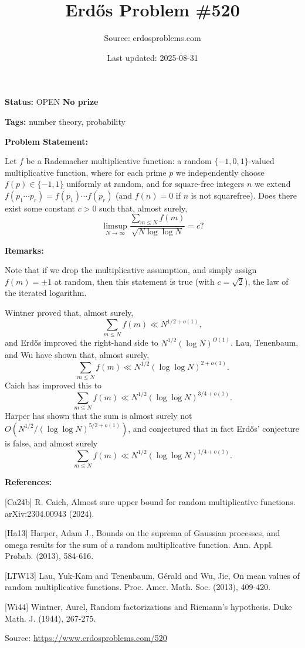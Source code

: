 \documentclass{article}
\title{Erd\H{o}s Problem \#520}
\date{Last updated: 2025-08-31}
\author{Source: erdosproblems.com}
\begin{document}
\maketitle

\noindent\textbf{Status:} OPEN \quad \textbf{No prize}

\noindent\textbf{Tags:} number theory, probability

\medskip
\noindent\textbf{Problem Statement:}

Let $f$ be a Rademacher multiplicative function: a random $\{-1,0,1\}$-valued multiplicative function, where for each prime $p$ we independently choose $f(p)\in \{-1,1\}$ uniformly at random, and for square-free integers $n$ we extend $f(p_1\cdots p_r)=f(p_1)\cdots f(p_r)$ (and $f(n)=0$ if $n$ is not squarefree). Does there exist some constant $c>0$ such that, almost surely,\[\limsup_{N\to \infty}\frac{\sum_{m\leq N}f(m)}{\sqrt{N\log\log N}}=c?\]

\bigskip
\noindent\textbf{Remarks:}

Note that if we drop the multiplicative assumption, and simply assign $f(m)=\pm 1$ at random, then this statement is true (with $c=\sqrt{2}$), the law of the iterated logarithm.

 Wintner \cite{Wi44} proved that, almost surely,\[\sum_{m\leq N}f(m)\ll N^{1/2+o(1)},\]and Erd\H{o}s improved the right-hand side to $N^{1/2}(\log N)^{O(1)}$. Lau, Tenenbaum, and Wu \cite{LTW13} have shown that, almost surely,\[\sum_{m\leq N}f(m)\ll N^{1/2}(\log\log N)^{2+o(1)}.\]Caich \cite{Ca24b} has improved this to\[\sum_{m\leq N}f(m)\ll N^{1/2}(\log\log N)^{3/4+o(1)}.\]Harper \cite{Ha13} has shown that the sum is almost surely not $O(N^{1/2}/(\log\log N)^{5/2+o(1)})$, and conjectured that in fact Erd\H{o}s' conjecture is false, and almost surely\[\sum_{m\leq N}f(m) \ll N^{1/2}(\log\log N)^{1/4+o(1)}.\]

\bigskip
\noindent\textbf{References:}

[Ca24b] R. Caich, Almost sure upper bound for random multiplicative functions. arXiv:2304.00943 (2024).
 
 [Ha13] Harper, Adam J., Bounds on the suprema of Gaussian processes, and omega
results for the sum of a random multiplicative function. Ann. Appl. Probab. (2013), 584-616.
 
 [LTW13] Lau, Yuk-Kam and Tenenbaum, G\'{e}rald and Wu, Jie, On mean values of random multiplicative functions. Proc. Amer. Math. Soc. (2013), 409-420.
 
 [Wi44] Wintner, Aurel, Random factorizations and Riemann's hypothesis. Duke Math. J. (1944), 267-275.

\bigskip
\noindent\small{Source: \url{https://www.erdosproblems.com/520}}
\end{document}
